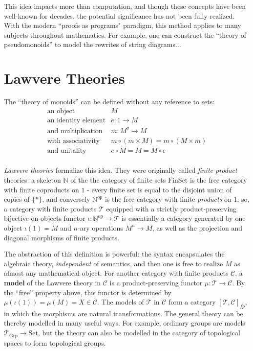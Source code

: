 \documentclass[a4paper,UKenglish]{article}
\theoremstyle{definition}
\newcommand{\Set}{\mathrm{Set}}
\newcommand{\Grp}{\mathrm{Grp}}
\newcommand{\FinSet}{\mathrm{FinSet}}
\newcommand{\op}{\mathrm{op}}
\newcommand{\NN}{\mathbb{N}}
\newcommand{\C}{\mathscr{C}}
\newcommand{\T}{\mathscr{T}}
\begin{document}
This idea impacts more than computation, and though these concepts have been well-known for decades, the potential significance has not been fully realized. With the modern ``proofs as programs" paradigm, this method applies to many subjects throughout mathematics. For example, one can construct the ``theory of pseudomonoids'' to model the rewrites of string diagrams...

\section{Lawvere Theories}
The ``theory of monoids'' can be defined without any reference to sets:
\[\begin{array}{rl}
\text{an object} & M\\
\text{an identity element} & e:1 \to M\\
\text{and multiplication} & m: M^2 \to M\\
\text{with associativity} & m \circ (m \times M) = m \circ (M \times m)\\
\text{and unitality} & e \circ M = M = M \circ e\\
\end{array}\]

\textit{Lawvere theories} formalize this idea. They were originally called \textit{finite product} theories: a skeleton $\NN$ of the the category of finite sets $\FinSet$ is the free category with finite coproducts on $1$ - every finite set is equal to the disjoint union of copies of $\{*\}$, and conversely $\NN^\op$ is the free category with finite \textit{products} on $1$; so, a category with finite products $\T$ equipped with a strictly product-preserving bijective-on-objects functor $\iota:\NN^\op \to \T$ is essentially a category generated by one object $\iota(1) = M$ and $n$-ary operations $M^n \to M$, as well as the projection and diagonal morphisms of finite products.

The abstraction of this definition is powerful: the syntax encapsulates the algebraic theory, \textit{independent} of semantics, and then one is free to realize $M$ as almost any mathematical object. For another category with finite products $\C$, a \textbf{model} of the Lawvere theory in $\C$ is a product-preserving functor $\mu: \T \to \C$. By the ``free'' property above, this functor is determined by $\mu(\iota(1)) = \mu(M) = X \in \C$. The models of $\T$ in $\C$ form a category $[\T,\C]_{fp}$, in which the morphisms are natural transformations. The general theory can be thereby modelled in many useful ways. For example, ordinary groups are models $\T_\Grp \to \Set$, but the theory can also be modelled in the category of topological spaces to form topological groups.
\end{document}
